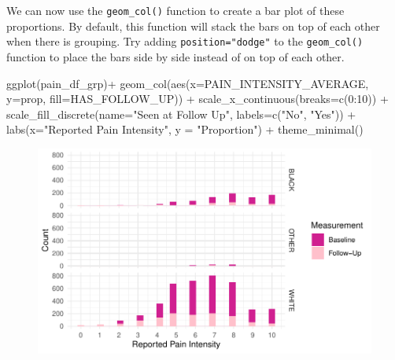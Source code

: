 \documentclass[
  letterpaper,
]{krantz}
\makeatletter
\newenvironment{Shaded}{\begin{snugshade}}{\end{snugshade}}
\newcommand{\AttributeTok}[1]{\textcolor[rgb]{0.40,0.45,0.13}{#1}}
\newcommand{\DecValTok}[1]{\textcolor[rgb]{0.68,0.00,0.00}{#1}}
\newcommand{\FunctionTok}[1]{\textcolor[rgb]{0.28,0.35,0.67}{#1}}
\newcommand{\NormalTok}[1]{\textcolor[rgb]{0.00,0.23,0.31}{#1}}
\newcommand{\SpecialCharTok}[1]{\textcolor[rgb]{0.37,0.37,0.37}{#1}}
\newcommand{\StringTok}[1]{\textcolor[rgb]{0.13,0.47,0.30}{#1}}
\newenvironment{kframe}{%
\medskip{}
\setlength{\fboxsep}{.8em}
 \def\at@end@of@kframe{}%
 \ifinner\ifhmode%
  \def\at@end@of@kframe{\end{minipage}}%
  \begin{minipage}{\columnwidth}%
 \fi\fi%
 \def\FrameCommand##1{\hskip\@totalleftmargin \hskip-\fboxsep
 \colorbox{shadecolor}{##1}\hskip-\fboxsep
     \hskip-\linewidth \hskip-\@totalleftmargin \hskip\columnwidth}%
 \MakeFramed {\advance\hsize-\width
   \@totalleftmargin\z@ \linewidth\hsize
   \@setminipage}}%
 {\par\unskip\endMakeFramed%
 \at@end@of@kframe}
\renewenvironment{Shaded}{\begin{kframe}}{\end{kframe}}
\makeatother
\begin{document}
We can now use the \texttt{geom\_col()} function to create a bar plot of
these proportions. By default, this function will stack the bars on top
of each other when there is grouping. Try adding
\texttt{position="dodge"} to the \texttt{geom\_col()} function to place
the bars side by side instead of on top of each other.

\begin{Shaded}
\begin{Highlighting}[]
\FunctionTok{ggplot}\NormalTok{(pain\_df\_grp)}\SpecialCharTok{+}
  \FunctionTok{geom\_col}\NormalTok{(}\FunctionTok{aes}\NormalTok{(}\AttributeTok{x=}\NormalTok{PAIN\_INTENSITY\_AVERAGE, }\AttributeTok{y=}\NormalTok{prop, }\AttributeTok{fill=}\NormalTok{HAS\_FOLLOW\_UP)) }\SpecialCharTok{+}
  \FunctionTok{scale\_x\_continuous}\NormalTok{(}\AttributeTok{breaks=}\FunctionTok{c}\NormalTok{(}\DecValTok{0}\SpecialCharTok{:}\DecValTok{10}\NormalTok{)) }\SpecialCharTok{+} 
  \FunctionTok{scale\_fill\_discrete}\NormalTok{(}\AttributeTok{name=}\StringTok{"Seen at Follow Up"}\NormalTok{, }\AttributeTok{labels=}\FunctionTok{c}\NormalTok{(}\StringTok{"No"}\NormalTok{, }\StringTok{"Yes"}\NormalTok{)) }\SpecialCharTok{+}
  \FunctionTok{labs}\NormalTok{(}\AttributeTok{x=}\StringTok{"Reported Pain Intensity"}\NormalTok{, }\AttributeTok{y =} \StringTok{"Proportion"}\NormalTok{) }\SpecialCharTok{+}
  \FunctionTok{theme\_minimal}\NormalTok{()}
\end{Highlighting}
\end{Shaded}

\begin{figure}[H]

{\centering \includegraphics[width=1\textwidth,height=\textheight]{book/7_visualization_ggplot_files/figure-pdf/unnamed-chunk-18-1.pdf}

}

\end{figure}
\end{document}
